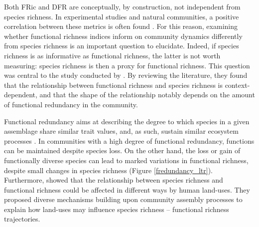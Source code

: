 \vspace{0.5cm}
Both FRic and DFR are conceptually, by construction, not independent from species richness. In experimental studies and natural communities, a positive correlation between these metrics is often found \citep{Cadotte2011}. For this reason, examining whether functional richness indices inform on community dynamics differently from species richness is an important question to elucidate. Indeed, if species richness is as informative as functional richness, the latter is not worth measuring: species richness is then a proxy for functional richness. This question was central to the study conducted by \citet{Cadotte2011}. By reviewing the literature, they found that the relationship between functional richness and species richness is context-dependent, and that the shape of the relationship notably depends on the amount of functional redundancy in the community. 

Functional redundancy aims at describing the degree to which species in a given assemblage share similar trait values, and, as such, sustain similar ecosystem processes \citep{Mayfield2010, Rosenfeld2002, Ricotta2016}. In communities with a high degree of functional redundancy, functions can be maintained despite species loss. On the other hand, the loss or gain of functionally diverse species can lead to marked variations in functional richness, despite small changes in species richness (Figure \ref{fredundancy_ltr}). Furthermore, \citet{Mayfield2010} showed that the relationship between species richness and functional richness could be affected in different ways by human land-uses. They proposed diverse mechanisms building upon community assembly processes to explain how land-uses may influence species richness – functional richness trajectories.  

